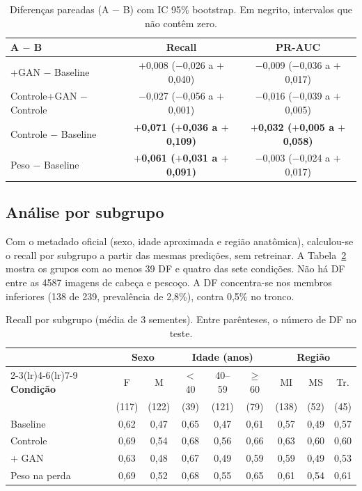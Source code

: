 \documentclass[conference]{IEEEtran}
\newcommand{\pl}{\ensuremath{+}}
\newcommand{\mn}{\ensuremath{-}}
\begin{document}
\begin{table}[ht]
\centering
\caption{Diferenças pareadas (A $-$ B) com IC 95\% bootstrap. Em negrito, intervalos que não contêm zero.}
\label{tab:diff}
\scriptsize
\setlength{\tabcolsep}{2pt}
\begin{tabular}{lcc}
\toprule
\textbf{A $-$ B} & \textbf{Recall} & \textbf{PR-AUC} \\
\midrule
+GAN $-$ Baseline & \pl0,008 (\mn0,026 a \pl0,040) & \mn0,009 (\mn0,036 a \pl0,017) \\
Controle+GAN $-$ Controle & \mn0,027 (\mn0,056 a \pl0,001) & \mn0,016 (\mn0,039 a \pl0,005) \\
Controle $-$ Baseline & \textbf{\pl0,071 (\pl0,036 a \pl0,109)} & \textbf{\pl0,032 (\pl0,005 a \pl0,058)} \\
Peso $-$ Baseline & \textbf{\pl0,061 (\pl0,031 a \pl0,091)} & \mn0,003 (\mn0,024 a \pl0,017) \\
\bottomrule
\end{tabular}
\end{table}

\subsection{Análise por subgrupo}
Com o metadado oficial (sexo, idade aproximada e região anatômica), calculou-se o recall por subgrupo a partir das mesmas predições, sem retreinar. A Tabela~\ref{tab:sub} mostra os grupos com ao menos 39 DF e quatro das sete condições. Não há DF entre as 4587 imagens de cabeça e pescoço. A DF concentra-se nos membros inferiores (138 de 239, prevalência de 2,8\%), contra 0,5\% no tronco.

\begin{table}[ht]
\centering
\caption{Recall por subgrupo (média de 3 sementes). Entre parênteses, o número de DF no teste.}
\label{tab:sub}
\scriptsize
\setlength{\tabcolsep}{2.2pt}
\begin{tabular}{lcccccccc}
\toprule
& \multicolumn{2}{c}{\textbf{Sexo}} & \multicolumn{3}{c}{\textbf{Idade (anos)}} & \multicolumn{3}{c}{\textbf{Região}} \\
\cmidrule(lr){2-3}\cmidrule(lr){4-6}\cmidrule(lr){7-9}
\textbf{Condição} & F & M & $<$40 & 40--59 & $\geq$60 & MI & MS & Tr. \\
& (117) & (122) & (39) & (121) & (79) & (138) & (52) & (45) \\
\midrule
Baseline & 0,62 & 0,47 & 0,65 & 0,47 & 0,61 & 0,57 & 0,49 & 0,57 \\
Controle & 0,69 & 0,54 & 0,68 & 0,56 & 0,66 & 0,63 & 0,60 & 0,60 \\
+ GAN & 0,63 & 0,48 & 0,67 & 0,49 & 0,59 & 0,59 & 0,49 & 0,53 \\
Peso na perda & 0,69 & 0,52 & 0,68 & 0,55 & 0,65 & 0,61 & 0,54 & 0,61 \\
\bottomrule
\end{tabular}
\end{table}
\end{document}
